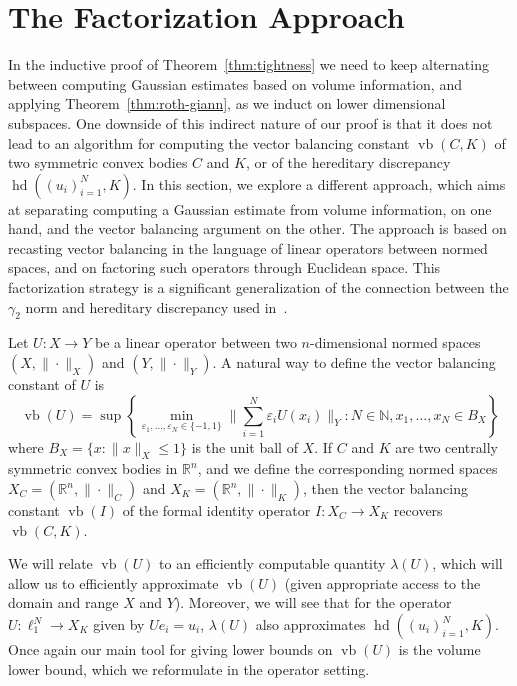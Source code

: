 \documentclass[11pt]{article}
\newcommand{\R}{{\mathbb{R}}}
\newcommand\eps{\varepsilon}
\DeclareMathOperator{\hd}{hd}
\DeclareMathOperator{\vb}{vb}
\begin{document}
\section{The Factorization Approach}
\label{sec:factorization}

In the inductive proof of Theorem~\ref{thm:tightness} we need to keep
alternating between computing Gaussian estimates based on volume
information, and applying Theorem~\ref{thm:roth-giann}, as we induct
on lower dimensional subspaces. One downside of this indirect nature
of our proof is that it does not lead to an algorithm for computing
the vector balancing constant $\vb(C,K)$ of two symmetric convex
bodies $C$ and $K$, or of the hereditary discrepancy $\hd((u_i)_{i =
  1}^N, K)$. In this section, we explore a different approach, which
aims at separating computing a Gaussian estimate from volume
information, on one hand, and the vector balancing argument on the
other. The approach is based on recasting vector balancing in the
language of linear operators between normed spaces, and on factoring
such operators through Euclidean space. This factorization strategy is
a significant generalization of the connection between the $\gamma_2$
norm and hereditary discrepancy used in~\cite{disc-gamma2}.

Let $U:X \to Y$ be a linear operator between two $n$-dimensional
normed spaces $(X, \| \cdot\|_X)$ and $(Y, \| \cdot\|_Y)$. A natural
way to define the vector balancing constant of $U$ is
\[
\vb(U) = \sup\left\{
  \min_{\eps_1, \ldots, \eps_N \in \{-1, 1\}} 
  \biggl\|\sum_{i = 1}^N \eps_i U(x_i)\biggr\|_Y:
  N \in \mathbb{N}, x_1, \ldots, x_N \in B_X\right\}
\]
where $B_X = \{x: \|x\|_X \le 1\}$ is the unit ball of $X$. If $C$ and
$K$ are two centrally symmetric convex bodies in $\R^n$, and we define
the corresponding normed spaces $X_C = (\R^n, \|\cdot\|_C)$ and $X_K =
(\R^n, \|\cdot\|_K)$, then the vector balancing constant $\vb(I)$ of
the formal identity operator $I:X_C \to X_K$ recovers $\vb(C, K)$.

We will relate $\vb(U)$ to an efficiently computable quantity
$\lambda(U)$, which will allow us to efficiently approximate $\vb(U)$
(given appropriate access to the domain and range $X$ and
$Y$). Moreover, we will see that for the operator $U:\ell_1^N \to X_K$
given by $Ue_i = u_i$, $\lambda(U)$ also approximates $\hd((u_i)_{i =
  1}^N, K)$. Once again our main tool for giving lower bounds on
$\vb(U)$ is the volume lower bound, which we reformulate in the
operator setting.
\end{document}
